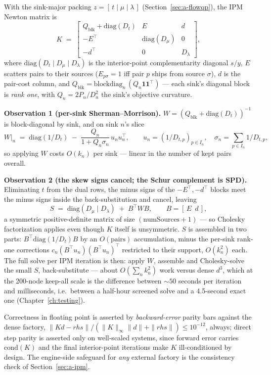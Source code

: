 With the sink-major packing $z = [\,t \mid \mu \mid \lambda\,]$
(Section~\ref{sec:a-flowqp}), the IPM Newton matrix is
\[
K \;=\;
\begin{bmatrix}
Q_{\mathrm{blk}} + \mathrm{diag}(D_t) & E & d\\[2pt]
-E^\top & \mathrm{diag}(D_\mu) & 0\\[2pt]
-d^\top & 0 & D_\lambda
\end{bmatrix},
\]
where $\mathrm{diag}(D_t \mid D_\mu \mid D_\lambda)$ is the interior-point
complementarity diagonal $s/y$, $E$ scatters pairs to their sources
($E_{p\sigma} = 1$ iff pair $p$ ships from source $\sigma$), $d$ is the
pair-cost column, and $Q_{\mathrm{blk}} =
\mathrm{blockdiag}_n\,(Q_n \mathbf{1}\mathbf{1}^\top)$ --- each sink's
diagonal block is \emph{rank one}, with $Q_n = 2P_n/D_n^2$ the sink's
objective curvature.

\textbf{Observation 1 (per-sink Sherman--Morrison).} $W = (Q_{\mathrm{blk}}
+ \mathrm{diag}(D_t))^{-1}$ is block-diagonal by sink, and on sink $n$'s
slice
\[
W|_n \;=\; \mathrm{diag}(1/D_t) \;-\;
\frac{Q_n}{1 + Q_n \sigma_n}\, u_n u_n^\top,
\qquad u_n = (1/D_{t,p})_{p \in I_n},\quad
\sigma_n = \textstyle\sum_{p \in I_n} 1/D_{t,p},
\]
so applying $W$ costs $O(k_n)$ per sink --- linear in the number of kept
pairs overall.

\textbf{Observation 2 (the skew signs cancel; the Schur complement is
SPD).} Eliminating $t$ from the dual rows, the minus signs of the
$-E^\top, -d^\top$ blocks meet the minus signs inside the
back-substitution and cancel, leaving
\[
S \;=\; \mathrm{diag}(D_\mu \mid D_\lambda) \;+\; B^\top W B,
\qquad B = [\,E \;\ d\,],
\]
a symmetric positive-definite matrix of size
$(\text{numSources}+1)$ --- so Cholesky factorization applies even though
$K$ itself is unsymmetric. $S$ is assembled in two parts:
$B^\top \mathrm{diag}(1/D_t) B$ by an $O(\text{pairs})$ accumulation, minus
the per-sink rank-one corrections
$c_n (B^\top u_n)(B^\top u_n)^\top$ restricted to their support,
$O(k_n^2)$ each. The full solve per IPM iteration is then: apply $W$,
assemble and Cholesky-solve the small $S$, back-substitute --- about
$O(\sum_n k_n^2)$ work versus dense $d^3$, which at the 200-node keep-all
scale is the difference between $\sim 50$ seconds per iteration and
milliseconds, i.e.\ between a half-hour screened solve and a 4.5-second
exact one (Chapter~\ref{ch:testing}).

Correctness in floating point is asserted by \emph{backward-error} parity
bars against the dense factory,
$\|Kd - \mathit{rhs}\| / (\|K\|_\infty \|d\| + \|\mathit{rhs}\|) \le
10^{-12}$, always; direct step parity is asserted only on well-scaled
systems, since forward error carries $\mathrm{cond}(K)$ and the final
interior-point iterations make $K$ ill-conditioned by design. The
engine-side safeguard for \emph{any} external factory is the
 consistency check of Section~\ref{sec:a-ipm}.

